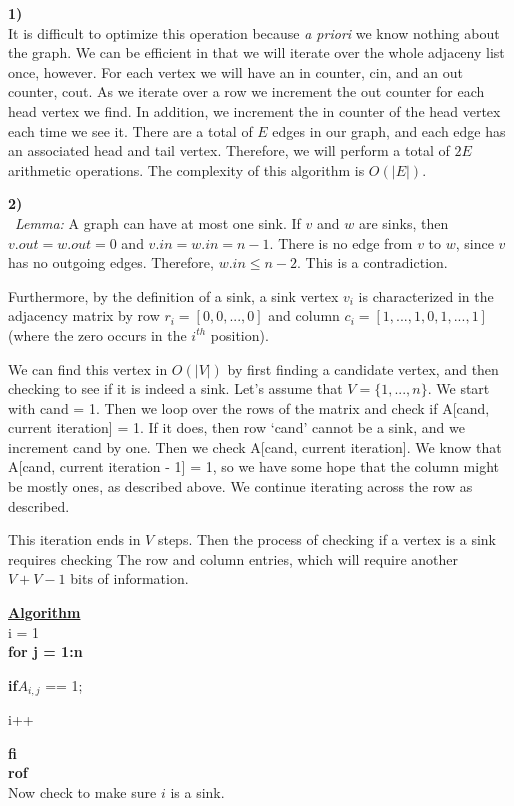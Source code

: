 \documentclass[10pt]{article}
\begin{document}
\noindent\textbf{1)}\\
It is difficult to optimize this operation because \emph{a priori} we know nothing about the graph. We can be efficient in that we will iterate over the whole adjaceny list once, however. For each vertex we will have an in counter, cin, and an out counter, cout. As we iterate over a row we increment the out counter for each head vertex we find. In addition, we increment the in counter of the head vertex each time we see it. There are a total of $E$ edges in our graph, and each edge has an associated head and tail vertex. Therefore, we will perform a total of $2E$ arithmetic operations. The complexity of this algorithm is $O(|E|)$. 


\noindent\textbf{2)}\\\
\emph{Lemma:} A graph can have at most one sink. If $v$ and $w$ are sinks, then $v.out = w.out = 0$ and $v.in = w.in = n-1$. There is no edge from $v$ to $w$, since $v$ has no outgoing edges. Therefore, $w.in \le n-2$. This is a contradiction.

Furthermore, by the definition of a sink, a sink vertex $v_i$ is characterized in the adjacency matrix by row $r_i = [0, 0, ..., 0]$ and column $c_i = [1, ...,1, 0, 1, ..., 1]$ (where the zero occurs in the $i^{th}$ position).  

We can find this vertex in $O(|V|)$ by first finding a candidate vertex, and then checking to see if it is indeed a sink. Let's assume that $V = \{1, ..., n\}$. We start with cand = 1. Then we loop over the rows of the matrix and check if A[cand, current iteration] = 1. If it does, then row `cand' cannot be a sink, and we increment cand by one. Then we check A[cand, current iteration]. We know that A[cand, current iteration - 1] = 1, so we have some hope that the column might be mostly ones, as described above. We continue iterating across the row as described. 

This iteration ends in $V$ steps. 
Then the process of checking if a vertex is a sink requires checking The row and column entries, which will require another $V + V - 1$ bits of information.

\noindent\textbf{\underline{Algorithm}}\\
\noindent i = 1\\
\textbf{for j = 1:n}

\indent\textbf{if}$A_{i, j}$ == 1;

\indent i++

\textbf{fi}\\
\textbf{rof}\\
Now check to make sure $i$ is a sink.
\end{document}
